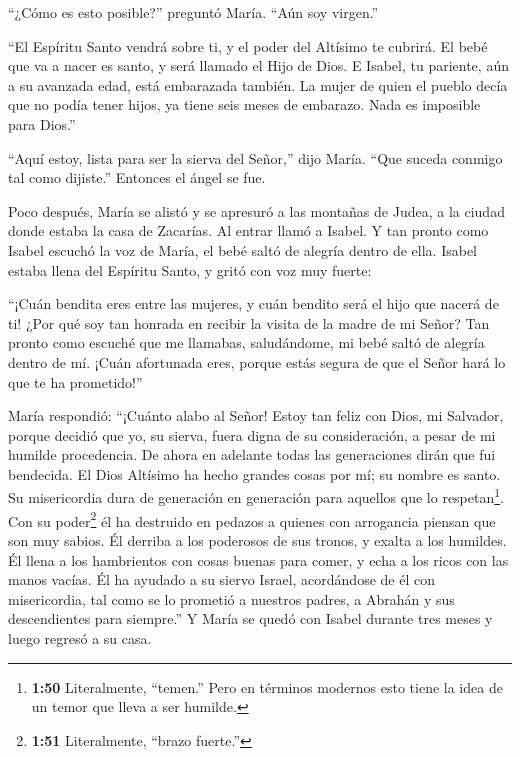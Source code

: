  ``¿Cómo es esto posible?'' preguntó María. ``Aún soy
virgen.''

 ``El Espíritu Santo vendrá sobre ti, y el poder del
Altísimo te cubrirá. El bebé que va a nacer es santo, y será llamado el
Hijo de Dios.  E Isabel, tu pariente, aún a su avanzada
edad, está embarazada también. La mujer de quien el pueblo decía que no
podía tener hijos, ya tiene seis meses de embarazo.  Nada
es imposible para Dios.''

 ``Aquí estoy, lista para ser la sierva del Señor,'' dijo
María. ``Que suceda conmigo tal como dijiste.'' Entonces el ángel se
fue.

 Poco después, María se alistó y se apresuró a las montañas
de Judea, a la ciudad donde  estaba la casa de Zacarías. Al
entrar llamó a Isabel.  Y tan pronto como Isabel escuchó la
voz de María, el bebé saltó de alegría dentro de ella. Isabel estaba
llena del Espíritu Santo,  y gritó con voz muy fuerte:

``¡Cuán bendita eres entre las mujeres, y cuán bendito será el hijo que
nacerá de ti!  ¿Por qué soy tan honrada en recibir la
visita de la madre de mi Señor?  Tan pronto como escuché
que me llamabas, saludándome, mi bebé saltó de alegría dentro de mí.
 ¡Cuán afortunada eres, porque estás segura de que el Señor
hará lo que te ha prometido!''

 María respondió: ``¡Cuánto alabo al Señor! 
Estoy tan feliz con Dios, mi Salvador,  porque decidió que
yo, su sierva, fuera digna de su consideración, a pesar de mi humilde
procedencia. De ahora en adelante todas las generaciones dirán que fui
bendecida.  El Dios Altísimo ha hecho grandes cosas por mí;
su nombre es santo.  Su misericordia dura de generación en
generación para aquellos que lo respetan\footnote{\textbf{1:50}
  Literalmente, ``temen.'' Pero en términos modernos esto tiene la idea
  de un temor que lleva a ser humilde.}.  Con su
poder\footnote{\textbf{1:51} Literalmente, ``brazo fuerte.''} él ha
destruido en pedazos a quienes con arrogancia piensan que son muy
sabios.  Él derriba a los poderosos de sus tronos, y exalta
a los humildes.  Él llena a los hambrientos con cosas
buenas para comer, y echa a los ricos con las manos vacías.
 Él ha ayudado a su siervo Israel, acordándose de él con
misericordia,  tal como se lo prometió a nuestros padres, a
Abrahán y sus descendientes para siempre.''  Y María se
quedó con Isabel durante tres meses y luego regresó a su casa.

